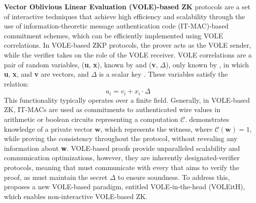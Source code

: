 \textbf{Vector Oblivious Linear Evaluation (VOLE)-based ZK} 
protocols are a set of interactive techniques that achieve high efficiency and scalability through the use of information-theoretic message authentication code (IT-MAC)-based commitment schemes, which can be efficiently implemented using VOLE correlations. In VOLE-based ZKP protocols, the prover acts as the VOLE sender, while the verifier takes on the role of the VOLE receiver.
VOLE correlations are a pair of random variables, (\textbf{u}, \textbf{x}), known by \Prv and (\textbf{v}, $\Delta$), only known by \Vrf, in which \textbf{u}, \textbf{x}, and \textbf{v} are vectors, and $\Delta$ is a scalar key \cite{}. These variables satisfy the relation:
\begin{equation*}
    u_i = v_i + x_i \cdot \Delta
\end{equation*}
This functionality typically operates over a finite field.
Generally, in VOLE-based ZK, IT-MACs are used as commitments to authenticated wire values in arithmetic or boolean circuits representing a computation $\mathcal{C}$. \Prv demonstrates knowledge of a private vector $\textbf{w}$, which represents the witness, where $\mathcal{C}(\textbf{w}) = 1$, while proving the consistency throughout the protocol, without revealing any information about \textbf{w}.
VOLE-based proofs provide unparalleled scalability and communication optimizations, however, they are inherently designated-verifier protocols, meaning that \Prv must communicate with every \Vrf that aims to verify the proof, as \Vrf must maintain the secret $\Delta$ to ensure soundness. To address this, \cite{baum2023publicly} proposes a new VOLE-based paradigm, entitled VOLE-in-the-head (VOLEitH), which enables non-interactive VOLE-based ZK.










